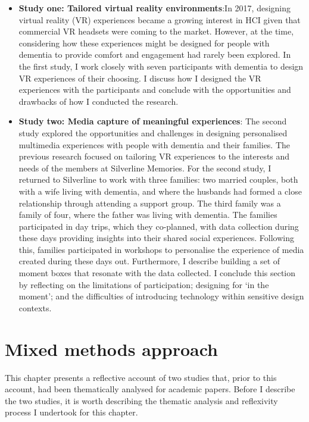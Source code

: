 \begin{itemize}
    \item  \textbf{Study one: Tailored virtual reality environments}:In 2017, designing virtual reality (VR) experiences became a growing interest in HCI given that commercial VR headsets were coming to the market. However, at the time, considering how these experiences might be designed for people with dementia to provide comfort and engagement had rarely been explored. In the first study, I work closely with seven participants with dementia to design VR experiences of their choosing. I discuss how I designed the VR experiences with the participants and conclude with the opportunities and drawbacks of how I conducted the research.

    \item \textbf{Study two: Media capture of meaningful experiences}: The second study explored the opportunities and challenges in designing personalised multimedia experiences with people with dementia and their families. The previous research focused on tailoring VR experiences to the interests and needs of the members at Silverline Memories. For the second study, I returned to Silverline to work with three families: two married couples, both with a wife living with dementia, and where the husbands had formed a close relationship through attending a support group. The third family was a family of four, where the father was living with dementia. The families participated in day trips, which they co-planned, with data collection during these days providing insights into their shared social experiences. Following this, families participated in workshops to personalise the experience of media created during these days out. Furthermore, I describe building a set of moment boxes that resonate with the data collected. I conclude this section by reflecting on the limitations of participation; designing for `in the moment'; and the difficulties of introducing technology within sensitive design contexts.
\end{itemize}

\section{Mixed methods approach}
\label{mixed-methods}
This chapter presents a reflective account of two studies that, prior to this account, had been thematically analysed for academic papers. Before I describe the two studies, it is worth describing the thematic analysis and reflexivity process I undertook for this chapter.

